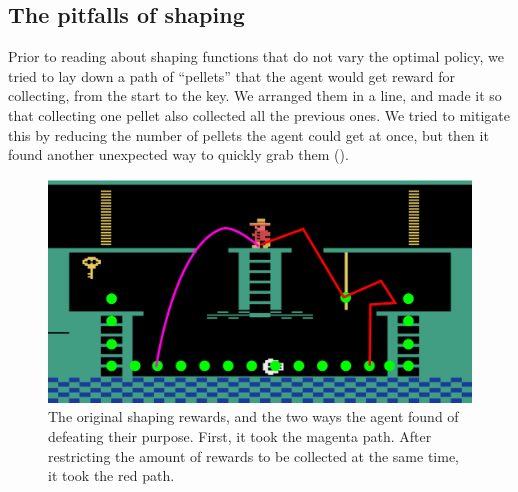
\subsection{The pitfalls of shaping\label{subsec:evaluation-shaping}}
Prior to reading about shaping functions that do not vary the optimal policy, we
tried to lay down a path of ``pellets'' that the agent would get reward for
collecting, from the start to the key. We arranged them in a line, and made it
so that collecting one pellet also collected all the previous ones. We tried to
mitigate this by reducing the number of pellets the agent could get at once, but
then it found another unexpected way to quickly grab them
().

\begin{figure}[hbtp]
\begin{center}
\includegraphics[width=\textwidth / 3 * 2]{img/shaping-defeated.pdf}
\end{center}
\caption{The original shaping rewards, and the two ways the agent found of
  defeating their purpose. First, it took the magenta path. After restricting
  the amount of rewards to be collected at the same time, it took the red
path.\label{fig:shaping-pitfalls}}
\end{figure}

